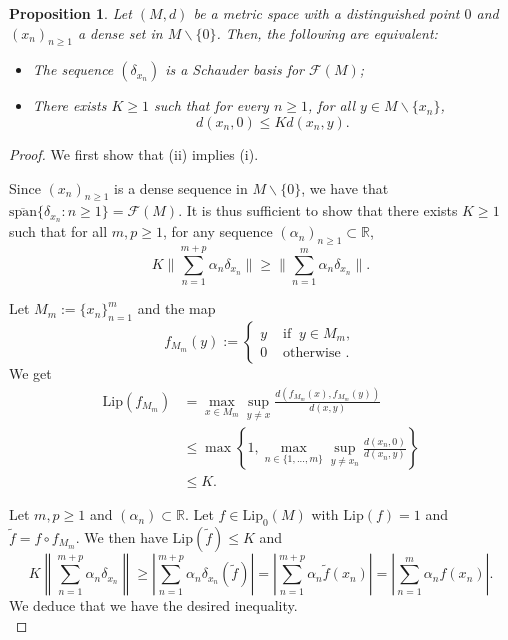 \documentclass[12pt,english]{amsart}
\numberwithin{equation}{section}
\theoremstyle{plain}
\newtheorem{proposition}[theorem]{Proposition}
\theoremstyle{definition}
\def\aa{\alpha}
\renewcommand{\tilde}{\widetilde}
\def\lip{ \text{Lip}}
\begin{document}
\begin{proposition}\label{prop:deltas-basis}
    Let $(M,d)$ be a metric space with a distinguished point $0$ and $(x_n)_{n\geq 1}$ a dense set in $M\backslash\{0\}$. Then, the following are equivalent:
    \begin{itemize}
        \item[(i)] The sequence $(\delta_{x_n})$ is a Schauder basis for $\mathcal{F}(M)$;
        \item[(ii)] There exists $K\geq 1$ such that for every $n\ge 1$, for all $y\in M\backslash\{x_n\}$, 
        \[ d(x_n,0)\leq K d(x_n,y).\]
    \end{itemize}
\end{proposition}
\begin{proof}
We first show that (ii) implies (i). 

Since $(x_n)_{n\geq 1}$ is a dense sequence in $M\backslash\{0\}$, we have that $\overline{\text{span}}\{\delta_{x_n}:n\ge 1\}=\mathcal{F}(M)$. It is thus sufficient to show that there exists $K\ge 1$ such that for all $m,p\ge 1$,  for any sequence $(\aa_n)_{n\ge 1}\subset \mathbb{R}$,
\[K \|\sum_{n=1}^{m+p}\aa_n \delta_{x_n}\|\ge \|\sum_{n=1}^{m}\aa_n \delta_{x_n}\|.\]

Let $M_m:=\{x_n\}_{n=1}^m$ and the map
\begin{equation}\label{eq:retrac}
    f_{M_m}(y):=\begin{cases}
      y &\text{ if }\ y\in M_m, \\
  0 &\text{ otherwise }.
  \end{cases}
\end{equation}
We get 
\begin{align*}
\lip(f_{M_m})&=\max_{x\in M_m}\sup_{y\ne x}\frac{d(f_{M_m}(x),f_{M_m}(y))}{d(x,y)}\\
&\le \max\left\{1,\max_{n\in\{1,...,m\}}\sup_{y\ne x_n}\frac{d(x_n,0)}{d(x_n,y)}\right\}\\
&\le K.
\end{align*}

Let $m,p\ge 1$ and $(\aa_n)\subset \mathbb{R}$.
Let $f\in \text{Lip}_0(M)$ with $\lip(f)=1$ and $ \tilde{f}=f\circ f_{M_m}$.
We then have $\lip(\tilde{f})\le K$ and
\[
K\left \|\sum_{n=1}^{m+p}\aa_n\delta_{x_n} \right \|\geq \left |\sum_{n=1}^{m+p}\aa_n  \delta_{x_n}(\tilde{f})\right |= \left|\sum_{n=1}^{m+p}\aa_n\tilde{f}(x_n)\right|=\left|\sum_{n=1}^{m}\aa_n f(x_n)\right|.
\]
We deduce that we have the desired inequality.\\






\end{proof}
\end{document}
